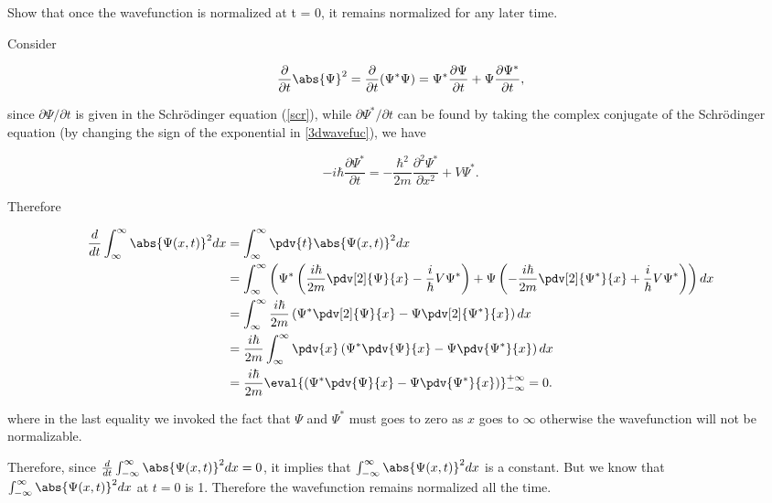 \documentclass[a4paper,12pt]{report}
\begin{document}
{Show that once the wavefunction is normalized at t = 0, it remains normalized for any later time.}
{Consider

\begin{equation}
  \frac{\partial }{\partial t} \abs{\Psi }^2 = \frac{\partial }{\partial t} (\Psi^*\Psi ) = \Psi ^* \frac{\partial \Psi }{\partial t} + \Psi \frac{\partial \Psi ^*}{\partial t}, 
\end{equation}

since \(\partial \Psi / \partial t \) is given in the Schrödinger equation (\cref{scr}), while \(\partial \Psi ^* /\partial t\) can be found by taking the complex conjugate of the Schrödinger equation (by changing the sign of the exponential in \cref{3dwavefuc}), we have
		
\begin{equation}
  -i \hbar \frac{\partial \Psi^*}{\partial t}=-\frac{\hbar^2}{2 m} \frac{\partial^2 \Psi^*}{\partial x^2}+V\Psi^*.
\end{equation}
		
Therefore
		
\begin{equation}
  \begin{aligned}
    \frac{d}{dt}  \int_{\infty}^{\infty}   \abs{\Psi(x,t)}^2 dx  &= \int_{\infty}^{\infty}   \pdv{t} \abs{\Psi(x,t)}^2 dx \\ &= \int_{\infty}^{\infty}   \left(\Psi^*\left(\frac{i\hbar}{2m}\pdv[2]{\Psi}{x} - \frac{i}{\hbar}V\Psi^*\right) + \Psi\left(-\frac{i\hbar}{2m}\pdv[2]{\Psi^*}{x} + \frac{i}{\hbar}V\Psi^*\right)\right)dx \\ &= \int_{\infty}^{\infty}   \frac{i\hbar}{2m}\left(\Psi^*\pdv[2]{\Psi}{x} - \Psi\pdv[2]{\Psi^*}{x}\right)dx \\ &= \frac{i\hbar}{2m}\int_{\infty}^{\infty}  \pdv{x}\left(\Psi^*\pdv{\Psi}{x} - \Psi\pdv{\Psi^*}{x}\right)dx \\ &= \frac{i\hbar}{2m} \eval{\left(\Psi^*\pdv{\Psi}{x} - \Psi\pdv{\Psi^*}{x}\right)}_{-\infty}^{+\infty} = 0. \label{ddtpsi2}
  \end{aligned}
\end{equation}

where in the last equality we invoked the fact that \(\Psi\) and \(\Psi^*\) must goes to zero as \(x\) goes to \(\infty\) otherwise the wavefunction will not be normalizable.
		
Therefore, since \(\frac{d}{dt}  \int_{-\infty}^{\infty} \abs{\Psi (x,t)}^2 dx = 0\), it implies that \( \int_{-\infty}^{\infty}   \abs{\Psi(x,t)}^2 dx\) is a constant. But we know that \( \int_{-\infty}^{\infty}   \abs{\Psi(x,t)}^2 dx\) at \(t = 0\) is 1. Therefore the wavefunction remains normalized all the time.}		
		
\end{document}
